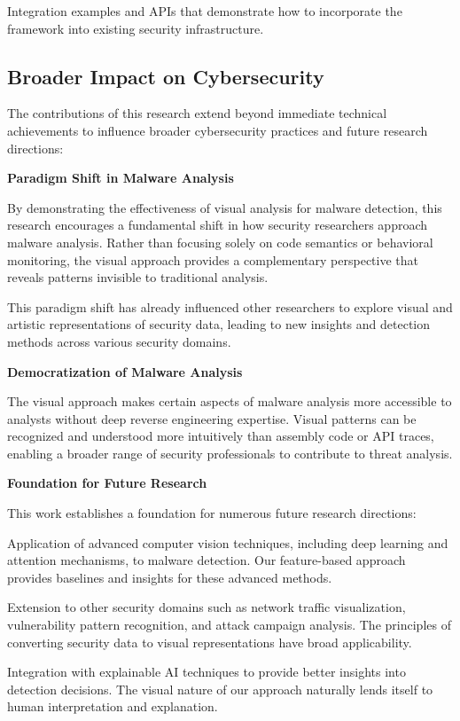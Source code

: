 Integration examples and APIs that demonstrate how to incorporate the framework into existing security infrastructure.

\subsection{Broader Impact on Cybersecurity}
\label{subsec:broader_impact}

The contributions of this research extend beyond immediate technical achievements to influence broader cybersecurity practices and future research directions:

\textbf{Paradigm Shift in Malware Analysis}

By demonstrating the effectiveness of visual analysis for malware detection, this research encourages a fundamental shift in how security researchers approach malware analysis. Rather than focusing solely on code semantics or behavioral monitoring, the visual approach provides a complementary perspective that reveals patterns invisible to traditional analysis.

This paradigm shift has already influenced other researchers to explore visual and artistic representations of security data, leading to new insights and detection methods across various security domains.

\textbf{Democratization of Malware Analysis}

The visual approach makes certain aspects of malware analysis more accessible to analysts without deep reverse engineering expertise. Visual patterns can be recognized and understood more intuitively than assembly code or API traces, enabling a broader range of security professionals to contribute to threat analysis.

\textbf{Foundation for Future Research}

This work establishes a foundation for numerous future research directions:

Application of advanced computer vision techniques, including deep learning and attention mechanisms, to malware detection. Our feature-based approach provides baselines and insights for these advanced methods.

Extension to other security domains such as network traffic visualization, vulnerability pattern recognition, and attack campaign analysis. The principles of converting security data to visual representations have broad applicability.

Integration with explainable AI techniques to provide better insights into detection decisions. The visual nature of our approach naturally lends itself to human interpretation and explanation.

